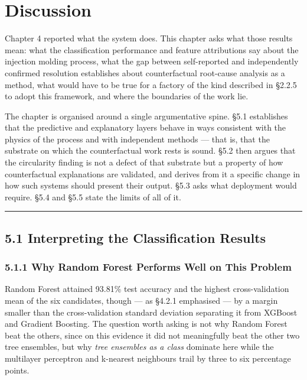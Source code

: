 \hypertarget{discussion}{%
\chapter{Discussion}\label{discussion}}

Chapter 4 reported what the system does. This chapter asks what those results mean: what the classification performance and feature attributions say about the injection molding process, what the gap between self-reported and independently confirmed resolution establishes about counterfactual root-cause analysis as a method, what would have to be true for a factory of the kind described in §2.2.5 to adopt this framework, and where the boundaries of the work lie.

The chapter is organised around a single argumentative spine. §5.1 establishes that the predictive and explanatory layers behave in ways consistent with the physics of the process and with independent methods --- that is, that the substrate on which the counterfactual work rests is sound. §5.2 then argues that the circularity finding is not a defect of that substrate but a property of how counterfactual explanations are validated, and derives from it a specific change in how such systems should present their output. §5.3 asks what deployment would require. §5.4 and §5.5 state the limits of all of it.

\begin{center}\rule{0.5\linewidth}{0.5pt}\end{center}

\hypertarget{interpreting-the-classification-results}{%
\section{5.1 Interpreting the Classification Results}\label{interpreting-the-classification-results}}

\hypertarget{why-random-forest-performs-well-on-this-problem}{%
\subsection{5.1.1 Why Random Forest Performs Well on This Problem}\label{why-random-forest-performs-well-on-this-problem}}

Random Forest attained 93.81\% test accuracy and the highest cross-validation mean of the six candidates, though --- as §4.2.1 emphasised --- by a margin smaller than the cross-validation standard deviation separating it from XGBoost and Gradient Boosting. The question worth asking is not why Random Forest beat the others, since on this evidence it did not meaningfully beat the other two tree ensembles, but why \emph{tree ensembles as a class} dominate here while the multilayer perceptron and k-nearest neighbours trail by three to six percentage points.

